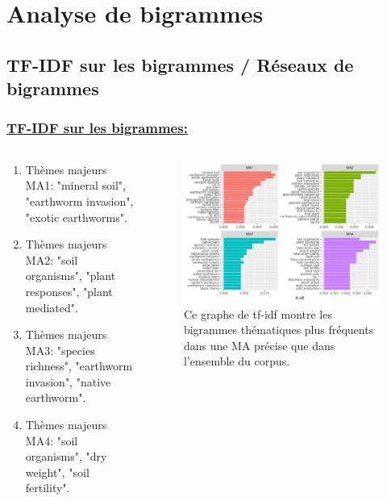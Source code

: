 \documentclass[xcolor=dvipsnames]{beamer}
\begin{document}
	\section*{Analyse de bigrammes}
	\subsection*{TF-IDF sur les bigrammes / Réseaux de bigrammes}

	\begin{frame}
		\frametitle{\underline{TF-IDF sur les bigrammes:}} 
		\begin{columns}
			\begin{column}{0.5\textwidth} %
				\begin{enumerate}
					\item Thèmes majeurs MA1: "mineral soil",
					"earthworm invasion", "exotic earthworms".
					\item Thèmes majeurs MA2: "soil organisms", "plant responses", "plant mediated".
					\item Thèmes majeurs MA3: "species richness", "earthworm invasion", "native earthworm".
					\item Thèmes majeurs MA4: "soil organisms", "dry weight", "soil fertility".
				\end{enumerate}
			\end{column}
			\begin{column}{0.5\textwidth}
				\begin{figure}[htb] %
					\begin{center} %
						\includegraphics[width=1\textwidth]{bigrammes_tf_idf.png}
						\caption{Ce graphe de tf-idf montre les bigrammes thématiques plus fréquents dans une MA précise que dans l'ensemble du corpus.}\label{bi_tf_idf}
					\end{center}
				\end{figure}
			\end{column}
		\end{columns}
	\end{frame}
\end{document}
